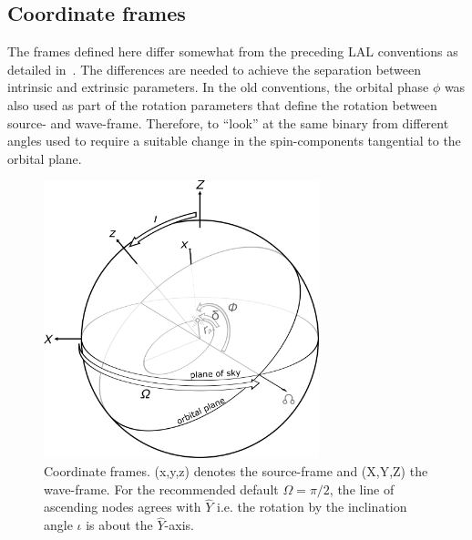 \documentclass[11pt,tightenlines,article,amssymb,amsmath,amsfonts,superscriptaddress,nofootinbib]{revtex4}
\newcommand{\EyW}{\hat Y}
\begin{document}


\subsection{Coordinate frames}
\label{sec:Frames}

The frames defined here differ somewhat from the preceding LAL
conventions as detailed in~\cite{inspiral}.
The differences are needed to achieve the separation between intrinsic
and extrinsic parameters.  In the old conventions, the orbital phase
$\phi$ was also used as part of the rotation parameters that define
the rotation between source- and wave-frame.  Therefore, to ``look''
at the same binary from different angles used to require a suitable
change in the spin-components tangential to the orbital plane.


\begin{figure}
  \includegraphics[width=80mm]{NRinj_orbitalelements.png}
  \caption{
  \label{fig:frames} Coordinate frames.
  (x,y,z) denotes the source-frame and (X,Y,Z) the wave-frame. For the recommended default
    $\Omega=\pi/2$, the line of ascending nodes agrees with $\EyW$
    i.e. the rotation by the inclination angle $\iota$ is about the
    $\EyW$-axis.}
  \end{figure}
\end{document}
